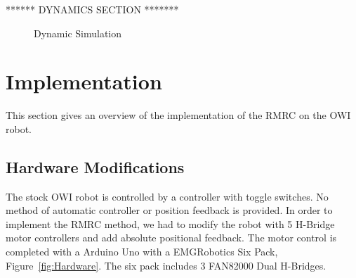 \documentclass[paper=letter, fontsize=10pt]{scrartcl}	%
\numberwithin{equation}{section}															%
\numberwithin{figure}{section}																%
\numberwithin{table}{section}																%
\begin{document}
****** DYNAMICS SECTION *******

\begin{figure}[!h]
  \centering
   \quad
    \caption{Dynamic Simulation}
    \label{fig:Simulation}
\end{figure}

\section{Implementation}
This section gives an overview of the implementation of the RMRC on the OWI robot.

\subsection{Hardware Modifications}
The stock OWI robot is controlled by a controller with toggle switches. No method of automatic controller or position feedback is provided. In order to implement the RMRC method, we had to modify the robot with 5 H-Bridge motor controllers and add absolute positional feedback. 
The motor control is completed with a Arduino Uno with a EMGRobotics Six Pack, Figure~\ref{fig:Hardware}. The six pack includes 3 FAN82000 Dual H-Bridges. 
\end{document}
